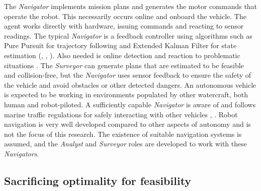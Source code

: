 \documentclass{tamuccthesis}
\begin{document}
The \textit{Navigator} implements mission plans and generates the motor commands that operate the robot. This necessarily occurs online and onboard the vehicle. The agent works directly with hardware, issuing commands and reacting to sensor readings. The typical \textit{Navigator} is a feedback controller using algorithms such as Pure Pursuit for trajectory following and Extended Kalman Filter for state estimation (\cite{purepursuit_kalman:2009}, \cite{kalman:naeem:2009}, \cite{gnss:gao:2016}). Also needed is online detection and reaction to problematic situations \cite{linearprog:len:2013}. The \textit{Surveyor} can generate plans that are estimated to be feasible and collision-free, but the \textit{Navigator} uses sensor feedback to ensure the safety of the vehicle and avoid obstacles or other detected dangers. An autonomous vehicle is expected to be working in environments populated by other watercraft, both human and robot-piloted. A sufficiently capable \textit{Navigator} is aware of and follows marine traffic regulations for safely interacting with other vehicles \cite{naeem2012colregs}, \cite{wang:2018}. Robot navigation is very well developed compared to other aspects of autonomy and is not the focus of this research. The existence of suitable navigation systems is assumed, and the \textit{Analyst} and \textit{Surveyor} roles are developed to work with these \textit{Navigators}. 

\subsection{Sacrificing optimality for feasibility}
\end{document}
